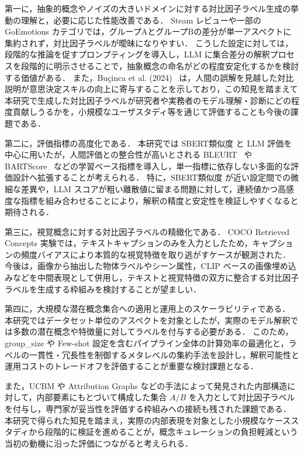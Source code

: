 第一に，抽象的概念やノイズの大きいドメインに対する対比因子ラベル生成の挙動の理解と，必要に応じた性能改善である．
Steam レビューや一部の GoEmotions カテゴリでは，グループAとグループBの差分が単一アスペクトに集約されず，対比因子ラベルが曖昧になりやすい．
こうした設定に対しては，段階的な推論を促すプロンプティングを導入し，LLM に集合差分の解釈プロセスを段階的に明示させることで，抽象概念の命名がどの程度安定化するかを検討する価値がある．
また，Bu\c{c}inca et al. (2024)~\cite{bucinca2024contrastive} は，人間の誤解を見越した対比説明が意思決定スキルの向上に寄与することを示しており，この知見を踏まえて本研究で生成した対比因子ラベルが研究者や実務者のモデル理解・診断にどの程度貢献しうるかを，小規模なユーザスタディ等を通じて評価することも今後の課題である．

第二に，評価指標の高度化である．
本研究では SBERT類似度 と LLM 評価を中心に用いたが，人間評価との整合性が高いとされる BLEURT~\cite{sellam-etal-2020-bleurt} や BARTScore~\cite{yuan2021bartscore} などの学習ベース指標を導入し，単一指標に依存しない多面的な評価設計へ拡張することが考えられる．
特に，SBERT類似度 が近い設定間での微細な差異や，LLM スコアが粗い離散値に留まる問題に対して，連続値かつ高感度な指標を組み合わせることにより，解釈の精度と安定性を検証しやすくなると期待される．

第三に，視覚概念に対する対比因子ラベルの精緻化である．
COCO Retrieved Concepts 実験では，テキストキャプションのみを入力としたため，キャプションの頻度バイアスにより本質的な視覚特徴を取り逃がすケースが観測された．
今後は，画像から抽出した物体ラベルやシーン属性，CLIP ベースの画像埋め込みなどを中間表現として併用し，テキストと視覚特徴の双方に整合する対比因子ラベルを生成する枠組みを検討することが望ましい．

第四に，大規模な潜在概念集合への適用と運用上のスケーラビリティである．
本研究ではデータセット単位のアスペクトを対象としたが，実際のモデル解釈では多数の潜在概念や特徴量に対してラベルを付与する必要がある．
このため，group\_size や Few-shot 設定を含むパイプライン全体の計算効率の最適化と，ラベルの一貫性・冗長性を制御するメタレベルの集約手法を設計し，解釈可能性と運用コストのトレードオフを評価することが重要な検討課題となる．

また，UCBM や Attribution Graphs などの手法によって発見された内部構造に対して，内部要素にもとづいて構成した集合 $A/B$ を入力として対比因子ラベルを付与し，専門家が妥当性を評価する枠組みへの接続も残された課題である．
本研究で得られた知見を踏まえ，実際の内部表現を対象とした小規模なケーススタディから段階的に検証を進めることが，概念キュレーションの負担軽減という当初の動機に沿った評価につながると考えられる．

